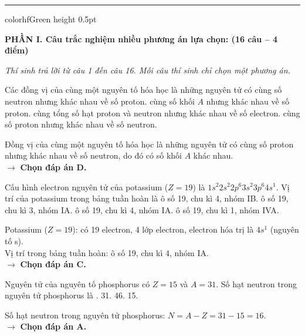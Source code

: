 \documentclass[11pt,a4paper]{article}
\begin{document}
\vspace{4pt}
\hrule color{hfGreen} height 0.5pt

\vspace{4pt}
\noindent
\textbf{\large\color{mainGreen}PHẦN I. Câu trắc nghiệm nhiều phương án lựa chọn: (16 câu – 4 điểm)}

\textit{Thí sinh trả lời từ câu 1 đến câu 16. Mỗi câu thí sinh chỉ chọn một phương án.}
\vspace{4pt}

\begin{ex}%
Các đồng vị của cùng một nguyên tố hóa học là những nguyên tử có
\choice
{cùng số neutron nhưng khác nhau về số proton.}
{cùng số khối $A$ nhưng khác nhau về số proton.}
{cùng tổng số hạt proton và neutron nhưng khác nhau về số electron.}
{\True cùng số proton nhưng khác nhau về số neutron.}
\begin{loigiai}
Đồng vị của cùng một nguyên tố hóa học là những nguyên tử có cùng số proton nhưng khác nhau về số neutron, do đó có số khối $A$ khác nhau.\\
$\rightarrow$ \textbf{Chọn đáp án D.}
\end{loigiai}
\end{ex}

\begin{ex}%
Cấu hình electron nguyên tử của potassium ($Z = 19$) là $1s^2 2s^2 2p^6 3s^2 3p^6 4s^1$. Vị trí của potassium trong bảng tuần hoàn là
\choice
{ô số 19, chu kì 4, nhóm IB.}
{ô số 19, chu kì 3, nhóm IA.}
{\True ô số 19, chu kì 4, nhóm IA.}
{ô số 19, chu kì 1, nhóm IVA.}
\begin{loigiai}
Potassium ($Z = 19$): có 19 electron, 4 lớp electron, electron hóa trị là $4s^1$ (nguyên tố s).\\
Vị trí trong bảng tuần hoàn: ô số 19, chu kì 4, nhóm IA.\\
$\rightarrow$ \textbf{Chọn đáp án C.}
\end{loigiai}
\end{ex}

\begin{ex}%
Nguyên tử của nguyên tố phosphorus có $Z = 15$ và $A = 31$. Số hạt neutron trong nguyên tử phosphorus là
\choice
{.}
{31.}
{46.}
{15.}
\begin{loigiai}
Số hạt neutron trong nguyên tử phosphorus: $N = A - Z = 31 - 15 = 16$.\\
$\rightarrow$ \textbf{Chọn đáp án A.}
\end{loigiai}
\end{ex}
\end{document}
